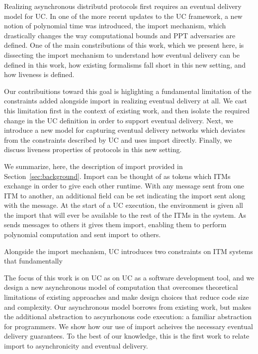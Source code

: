 Realizing asynchronous distributd protocols first requires an eventual delivery model for UC.
In one of the more recent updates to the UC framework, a new notion of polynomial time was introduced, the import mechanism, which drastically changes the way computational bounds and PPT adversaries are defined.
One of the main constributions of this work, which we present here, is dissecting the import mechanism to understand how eventual delivery can be defined in this work, how existing formalisms fall short in this new setting, and how liveness is defined.

Our contribuitions toward this goal is higlighting a fundamental limitation of the constraints added alongside import in realizing eventual delivery at all.
We cast this limitation first in the context of existing work, and then isolate the required change in the UC definition in order to support eventual delivery.
Next, we introduce a new model for capturing eventual delivery networks which deviates from the constraints described by UC and uses import directly.
Finally, we discuss liveness properties of protocols in this new setting. 

We summarize, here, the description of import provided in Section~\ref{sec:background}.
Import can be thought of as tokens which ITMs exchange in order to give each other runtime. 
With any message sent from one ITM to another, an additional field can be set indicating the import sent along with the message.
At the start of a UC execution, the environment is given all the import that will ever be available to the rest of the ITMs in the system. 
As \Z sends messages to others it gives them import, enabling them to perform polynomial computation and sent import to others.

Alongside the import mechanism, UC introduces two constraints on ITM systems that fundamentally 


The focus of this work is on UC as on UC as a software development tool, and we design a new asynchronous model of computation that overcomes theoretical limitations of existing approaches and make design choices that reduce code size and complexity.
Our asynchronous model borrows from existing work, but makes the additional abstraction to ascynrhonous code execution: a familiar abstraction for programmers.
We show how our use of import acheives the necessary eventual delivery guarantees.
To the best of our knowledge, this is the first work to relate import to asynchronicity and eventual delivery.

